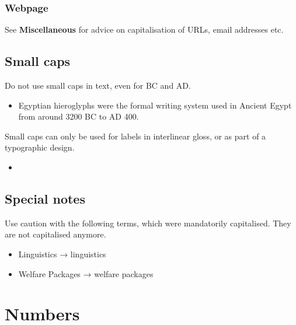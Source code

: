 \documentclass[11pt,a4paper]{book}
\newcommand{\cmark}{{\color{green(html/cssgreen)}\checkmark}}%
\begin{document}
				\subsection{Webpage}
				See \textbf{Miscellaneous} for advice on capitalisation of URLs, email addresses etc.
			\section{Small caps}
				Do not use small caps in text, even for BC and AD.
				{\firasans \begin{mdframed}[backgroundcolor=aliceblue] \begin{itemize}[label=\cmark]
							\item Egyptian hieroglyphs were the formal writing system used in Ancient Egypt from around 3200 BC to AD 400.
				\end{itemize} \end{mdframed} }
				Small caps can only be used for labels in interlinear gloss, or as part of a typographic design.
				{\firasans \begin{mdframed}[backgroundcolor=aliceblue] \begin{itemize}[label=\cmark]
							\item {\firasans
							\begin{exe}
							\end{exe}}
				\end{itemize} \end{mdframed} }
			\section{Special notes}
			Use caution with the following terms, which were mandatorily capitalised. They are not capitalised anymore.
				{\firasans \begin{mdframed}[backgroundcolor=aliceblue] \begin{itemize}[label=\cmark]
					\item Linguistics → linguistics
					\item Welfare Packages → welfare packages
				\end{itemize} \end{mdframed} }
		\chapter{Numbers}
\end{document}
